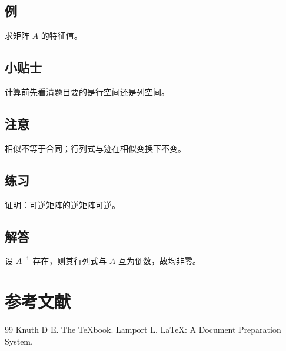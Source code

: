\documentclass{harryopo-book}
\begin{document}
\section{例}
\begin{examplebox}
求矩阵 $A$ 的特征值。
\end{examplebox}

\section{小贴士}
\begin{tipbox}
计算前先看清题目要的是行空间还是列空间。
\end{tipbox}

\section{注意}
\begin{warningbox}
相似不等于合同；行列式与迹在相似变换下不变。
\end{warningbox}

\section{练习}
\begin{practicebox}
证明：可逆矩阵的逆矩阵可逆。
\end{practicebox}

\section{解答}
\begin{answerbox}
设 $A^{-1}$ 存在，则其行列式与 $A$ 互为倒数，故均非零。
\end{answerbox}

\backmatter
\chapter*{参考文献}
\begin{thebibliography}{99}
 Knuth D E. The TeXbook.
 Lamport L. LaTeX: A Document Preparation System.
\end{thebibliography}
\end{document}
